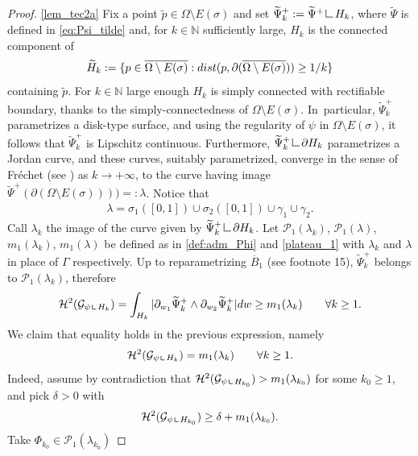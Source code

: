 \documentclass[11pt]{article}
\newcommand{\skpt}{\smallskip}
\numberwithin{equation}{section}
\let\Om\Omega
\newcommand{\resa}{\mathop{\hbox{\vrule height 7pt width 0.5pt depth 0pt
\vrule height 0.5pt width 6pt depth 0pt}}\nolimits}
\newcommand{\resb}{\mathop{\hbox{\vrule height 4pt width 0.5pt depth 0pt
\vrule height 0.5pt width 3pt depth 0pt}}\nolimits}
\newcommand{\res}{\mathchoice{\resa}{\resa}{\resb}{\resb}}
\theoremstyle{definition}
\begin{document}
\skpt
\begin{proof}
\ref{lem_tec2a}
Fix a point $\widetilde p\in \Om\setminus E(\sigma)$ and set $\widetilde \Psi^+_k:=\widetilde\Psi^+\res H_k$,
where $\widetilde \Psi$ is defined in \eqref{eq:Psi_tilde}
and, for $k\in \mathbb N$ sufficiently large, $H_k$ is the
connected component of
\[
\widetilde H_k:=\{p\in \overline{\Om\setminus E(\sigma)}:\textup{dist}(p,\partial(\overline{\Om\setminus E(\sigma)}) )\geq 1/k\}
\]
containing $\widetilde p$.
For $k \in \mathbb N$ large enough $H_k$ is
simply connected with rectifiable boundary, thanks to the simply-connectedness of $ \Om\setminus E(\sigma)$.
In~particular, $\widetilde \Psi^+_k$ parametrizes a disk-type surface, and
using the regularity of $ \psi$ in ${\Om\setminus E(\sigma)}$,
it follows that $\widetilde \Psi^+_k$ is Lipschitz continuous.
Furthermore,
$\widetilde \Psi^+_k\res \partial H_k$
parametrizes a Jordan curve,
and these curves, suitably parametrized,
converge in the sense of Fréchet (see \cite[Th.\,4, \S 4.3]{DHS})
as $k\to +\infty$, to the curve having image
$\widetilde \Psi^+(\partial ({\Om\setminus E(\sigma)}) ) )=:\lambda$.
Notice that
\begin{align}\label{lambda}
\lambda=\sigma_1([0,1])\cup\sigma_2([0,1])\cup\gamma_1\cup \gamma_2.
\end{align}
Call $\lambda_k$ the image of the curve given by
$\widetilde \Psi^+_k\res \partial H_k$.
Let $\mathcal{P}_1(\lambda_k)$, $\mathcal{P}_1(\lambda)$, $m_1(\lambda_k)$, $m_1(\lambda)$ be defined as in \eqref{def:adm_Phi} and \eqref{plateau_1} with $\lambda_k$ and $\lambda$ in place of $\Gamma$ respectively.
Up to reparametrizing $\overline B_1$ (see footnote 15),
$\widetilde\Psi^+_k$ belongs to $\mathcal{P}_1(\lambda_k)$, therefore
\[
\mathcal H^2( \mathcal G_{\psi\res H_{k}})=\int_{H_k}|\partial_{w_1}\widetilde \Psi_k^+\wedge \partial_{w_2}\widetilde \Psi_k^+ |dw\geq m_1(\lambda_k)\qquad\forall k\geq1.
\]
We claim that equality holds in the previous expression, namely
\begin{align}\label{claim_speranza}
\mathcal H^2( \mathcal G_{\psi\res H_k})=m_1(\lambda_k)\qquad \forall k\geq1.
\end{align}
Indeed, assume by contradiction that $\mathcal H^2( \mathcal G_{\psi\res H_{k_0}})>m_1(\lambda_{k_0})$ for some $k_0\geq1$,
and pick $\delta>0$ with
\begin{equation}\label{eq:absurd}
\mathcal H^2( \mathcal G_{\psi\res H_{k_0}})\geq \delta+
m_1(\lambda_{k_0}).
\end{equation}
Take $\Phi_{k_0}\in \mathcal{P}_1(\lambda_{k_0})$

\end{proof}
\end{document}
